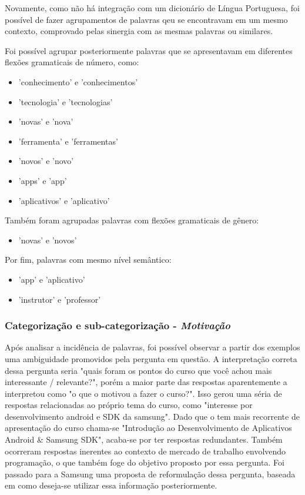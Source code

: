 Novamente, como não há integração com um dicionário de Língua Portuguesa, foi possível de fazer agrupamentos de palavras qeu se encontravam em um mesmo contexto, comprovado pelas sinergia com as mesmas palavras ou similares. 

Foi possível agrupar posteriormente palavras que se apresentavam em diferentes flexões gramaticais de número, como: 

\begin{itemize}
\item 'conhecimento' e 'conhecimentos'
\item 'tecnologia' e 'tecnologias' 
\item 'novas' e 'nova' 
\item 'ferramenta' e 'ferramentas' 
\item 'novos' e 'novo' 
\item 'apps' e 'app'
\item 'aplicativos' e 'aplicativo'
\end{itemize}

Também foram agrupadas palavras com flexões gramaticais de gênero:

\begin{itemize}
\item 'novas' e 'novos'
\end{itemize}

Por fim, palavras com mesmo nível semântico:

\begin{itemize}
\item 'app' e 'aplicativo'
\item 'instrutor' e 'professor'
\end{itemize}



\subsubsection*{Categorização e sub-categorização - \textit{Motivação}}

Após analisar a incidência de palavras, foi possível observar a partir dos exemplos uma ambiguidade promovidos pela pergunta em questão. A interpretação correta dessa pergunta seria "quais foram os pontos do curso que você achou mais interessante / relevante?", porém a maior parte das respostas aparentemente a interpretou como "o que o motivou a fazer o curso?". Isso gerou uma séria de respostas relacionadas ao próprio tema do curso, como "interesse por desenvolvimento android e SDK da samsung". Dado que o tem mais recorrente de apresentação do curso chama-se "Introdução ao Desenvolvimento de Aplicativos Android \& Samsung SDK", acaba-se por ter respostas redundantes. Também ocorreram respostas inerentes ao contexto de mercado de trabalho envolvendo programação, o que também foge do objetivo proposto por essa pergunta. Foi passado para a Samsung uma proposta de reformulação dessa pergunta, baseada em como deseja-se utilizar essa informação posteriormente.

